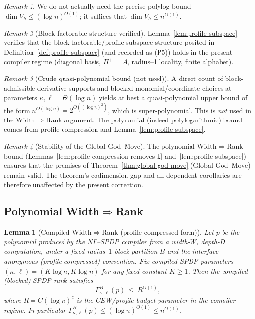 \documentclass[12pt]{article}
\newtheorem{lemma}[theorem]{Lemma}
\theoremstyle{definition}
\theoremstyle{definition}
\theoremstyle{remark}
\newtheorem{remark}{Remark}
\theoremstyle{remark}
\begin{document}
\begin{remark}
We do not actually need the precise polylog bound $\dim V_{h} \le (\log n)^{O(1)}$; it suffices that $\dim V_{h} \le n^{O(1)}$.
\end{remark}

\begin{remark}[Block-factorable structure verified]
\label{rem:block-factorable-verified}
Lemma~\ref{lem:profile-subspace} verifies that the block-factorable/profile-subspace structure posited in
Definition~\ref{def:profile-subspace} (and recorded as (P5)) holds in the present compiler regime (diagonal basis,
$\Pi^+=A$, radius--1 locality, finite alphabet).
\end{remark}

\begin{remark}[Crude quasi-polynomial bound (not used)]
\label{rem:quasi-poly-not-used}
A direct count of block-admissible derivative supports and blocked monomial/coordinate
choices at parameters $\kappa,\ell=\Theta(\log n)$ yields at best a quasi-polynomial upper bound
of the form $n^{O(\log n)} = 2^{O((\log n)^2)}$, which is super-polynomial.
This is \emph{not} used in the Width$\Rightarrow$Rank argument. The polynomial (indeed
polylogarithmic) bound comes from profile compression and Lemma~\ref{lem:profile-subspace}.
\end{remark}

\begin{remark}[Stability of the Global God--Move]
\label{rem:god-move-stability}
The polynomial Width$\Rightarrow$Rank bound (Lemmas~\ref{lem:profile-compression-removes-k} and~\ref{lem:profile-subspace})
ensures that the premises of Theorem~\ref{thm:global-god-move} (Global God--Move) remain valid.
The theorem's codimension gap and all dependent corollaries are therefore
unaffected by the present correction.
\end{remark}

\subsection{Polynomial Width$\Rightarrow$Rank}

\begin{lemma}[Compiled Width$\Rightarrow$Rank (profile-compressed form)]
\label{lem:compiled-width-rank}\label{lem:width-to-rank}\label{lem:width-implies-rank}\label{thm:width-to-rank}\label{thm:poly-width-rank}
Let $p$ be the polynomial produced by the NF--SPDP compiler from a width-$W$, depth-$D$
computation, under a fixed radius--$1$ block partition $B$ and the interface-anonymous
(profile-compressed) convention.
Fix compiled SPDP parameters $(\kappa,\ell)=(K\log n,K\log n)$
for any fixed constant $K\ge 1$. Then the compiled (blocked) SPDP rank satisfies
\[
\Gamma^{B}_{\kappa,\ell}(p)\ \le\ R^{O(1)},
\]
where $R=C(\log n)^c$ is the CEW/profile budget parameter in the compiler regime.
In particular $\Gamma^{B}_{\kappa,\ell}(p)\le (\log n)^{O(1)}\le n^{O(1)}$.
\end{lemma}
\end{document}

